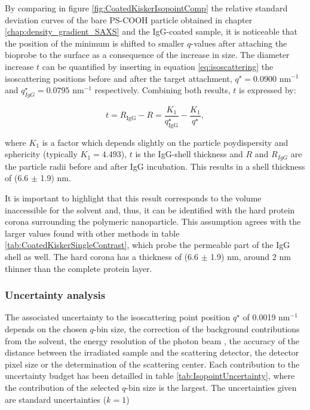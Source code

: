 By comparing in figure \ref{fig:CoatedKiskerIsopointComp} the relative standard deviation curves of the bare PS-COOH particle obtained in chapter \ref{chap:density_gradient_SAXS} and the IgG-coated sample, it is noticeable that the position of the minimum is shifted to smaller $q$-values after attaching the bioprobe to the surface as a consequence of the increase in size. The diameter increase $t$ can be quantified by inserting in equation \ref{eq:isoscattering} the isoscattering positions before and after the target attachment, $q^{\star}=0.0900$ nm$^{-1}$ and $q^{\star}_{IgG}=0.0795$ nm$^{-1}$ respectively. Combining both results, $t$ is expressed by:


\begin{equation}
t = R_{\text{IgG}} - R = \frac{K_1}{q^{\star}_{\text{IgG}}}-\frac{K_1}{q^{\star}} ,
\label{eq:IsopointRadiusDifference}
\end{equation}

where $K_1$ is a factor which depends slightly on the particle poydispersity and sphericity (typically $K_1 = 4.493$), $t$ is the IgG-shell thickness and $R$ and $R_{IgG}$ are the particle radii before and after IgG incubation. This results in a shell thickness of (6.6 $\pm$ 1.9) nm. 

It is important to highlight that this result corresponds to the volume inaccessible for the solvent and, thus, it can be identified with the hard protein corona surrounding the polymeric nanoparticle. This assumption agrees with the larger values found with other methods in table \ref{tab:CoatedKiskerSingleContrast}, which probe the permeable part of the IgG shell as well. The hard corona has a thickness of (6.6 $\pm$ 1.9) nm, around 2 nm thinner than the complete protein layer.

\subsubsection{Uncertainty analysis}
The associated uncertainty to the isoscattering point position $q^{\star}$ of 0.0019 nm$^{-1}$ depends on the chosen $q$-bin size, the correction of the background contributions from the solvent, the energy resolution of the photon beam \citep{krumrey_high-accuracy_2001}, the accuracy of the distance between the irradiated sample and the scattering detector, the detector pixel size \citep{wernecke_characterization_2014} or the determination of the scattering center. Each contribution to the uncertainty budget has been detailled in table \ref{tab:IsopointUncertainty}, where the contribution of the selected $q$-bin size is the largest. The uncertainties given are standard uncertainties ($k = 1$)

